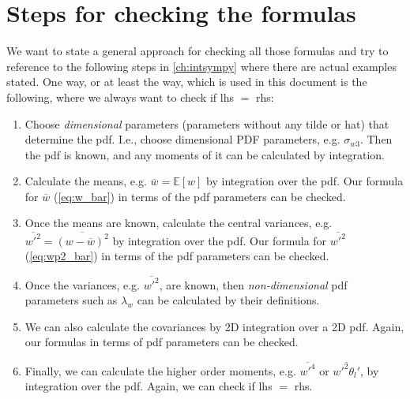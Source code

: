 \section{Steps for checking the formulas}\label{sec:steps_for_checking}

We want to state a general approach for checking all those formulas and try to reference to the following steps in \cref{ch:intsympy} where there are actual examples stated.
One way, or at least the way, which is used in this document is the following, where we always want to check if \gls{lhs} $=$ \gls{rhs}:

\begin{enumerate}
    \item\label{itm:checkingstep_1}
    Choose \emph{dimensional} parameters (parameters without any tilde or hat) that determine the \gls{pdf}.
    I.e., choose dimensional PDF parameters, e.g. $\sigma_{w 3}$.
    Then the \gls{pdf} is known, and any moments of it can be calculated by integration.

    \item\label{itm:checkingstep_2}
    Calculate the means, e.g. $\overline{w} = \mathbb{E}[w]$ by integration over the \gls{pdf}.
    Our formula for $\overline{w}$ (\cref{eq:w_bar}) in terms of the \gls{pdf} parameters can be checked.

    \item\label{itm:checkingstep_3}
    Once the means are known, calculate the central variances, e.g.  $\overline{w'^2} = \overline{(w-\overline{w})^2}$ by integration over the \gls{pdf}.
    Our formula for $\overline{w'^2}$ (\cref{eq:wp2_bar}) in terms of the \gls{pdf} parameters can be checked.

    \item\label{itm:checkingstep_4}
    Once the variances, e.g. $\overline{w'^2}$, are known, then \emph{non-dimensional} \gls{pdf} parameters such as $\lambda_w$ can be calculated by their definitions.

    \item\label{itm:checkingstep_5}
    We can also calculate the covariances by 2D integration over a 2D \gls{pdf}.
    Again, our formulas in terms of \gls{pdf} parameters can be checked.

    \item\label{itm:checkingstep_6}
    Finally, we can calculate the higher order moments, e.g. $\overline{w'^4}$ or $\overline{w'^2 \theta_l'}$, by integration over the \gls{pdf}.
    Again, we can check if \gls{lhs} $=$ \gls{rhs}.


\end{enumerate}
